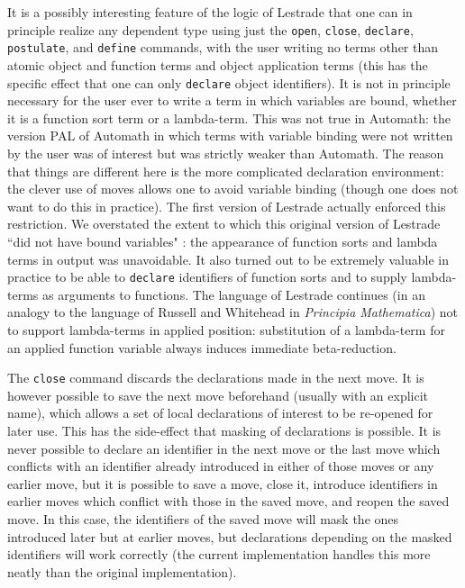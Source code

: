 \documentclass[12pt]{article}
\begin{document}
It is a possibly interesting feature of the logic of Lestrade that one can in principle realize any dependent type using just the {\tt open}, {\tt close}, {\tt declare}, {\tt postulate}, and {\tt define} commands, with the user writing no terms other than atomic object and function terms and object application terms (this has the specific effect that one can only {\tt declare} object identifiers).  It is not in principle necessary for the user ever to write
a term in which variables are bound, whether it is a function sort term or a lambda-term.    This was not true in Automath:  the version PAL of Automath in which terms with variable binding were not written by the user was of interest but was strictly weaker than Automath.  The reason that things are different here is the more complicated declaration environment:  the clever use of moves allows one to avoid variable binding (though one does not want to do this in practice).  The first version of Lestrade actually enforced this restriction.  We overstated the extent to which this original version of Lestrade ``did not have bound variables" :  the appearance of function sorts and lambda terms in output was unavoidable.  It also turned out to be extremely valuable in practice to be able to {\tt declare} identifiers of function sorts and to supply lambda-terms as arguments to functions.  The language of Lestrade continues (in an analogy to the language of Russell and Whitehead in {\em Principia Mathematica\/}) not to support lambda-terms in applied position:  substitution of a lambda-term for an applied function variable always induces immediate beta-reduction.

The {\tt close} command discards the declarations made in the next move.  It is however possible to save the next move beforehand (usually with an explicit name), which allows
a set of local declarations of interest to be re-opened for later use.  This has the side-effect that masking of declarations is possible.  It is never possible to declare an identifier
in the next move or the last move which conflicts with an identifier already introduced in either of those moves or any earlier move, but it is possible to save a move, close it, introduce identifiers in earlier  moves which conflict with those in the saved move, and reopen the saved move.  In this case, the identifiers of the saved move will mask the ones introduced later but at earlier moves, but declarations depending on the masked identifiers will work correctly (the current implementation handles this more neatly than the original implementation).
\end{document}
